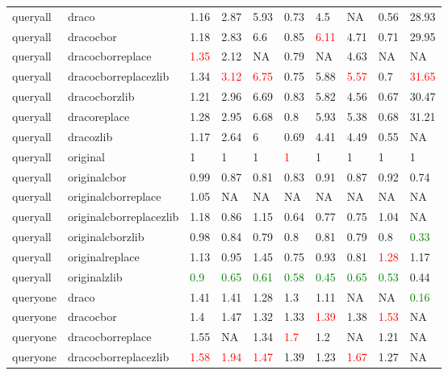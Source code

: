 \begin{landscape}
\begin{longtable}{llllllllll}
\rowcolor{lightgray}  queryall & draco & 1.16 & 2.87 & 5.93 & 0.73 & 4.5 & NA & 0.56 & 28.93\\
\rowcolor{lightgray}  queryall & dracocbor & 1.18 & 2.83 & 6.6 & 0.85 & \textcolor{red}{6.11} & 4.71 & 0.71 & 29.95\\
\rowcolor{lightgray}  queryall & dracocborreplace & \textcolor{red}{1.35} & 2.12 & NA & 0.79 & NA & 4.63 & NA & NA\\
\rowcolor{lightgray}  queryall & dracocborreplacezlib & 1.34 & \textcolor{red}{3.12} & \textcolor{red}{6.75} & 0.75 & 5.88 & \textcolor{red}{5.57} & 0.7 & \textcolor{red}{31.65}\\
\rowcolor{lightgray}  queryall & dracocborzlib & 1.21 & 2.96 & 6.69 & 0.83 & 5.82 & 4.56 & 0.67 & 30.47\\
\rowcolor{lightgray}  queryall & dracoreplace & 1.28 & 2.95 & 6.68 & 0.8 & 5.93 & 5.38 & 0.68 & 31.21\\
\rowcolor{lightgray}  queryall & dracozlib & 1.17 & 2.64 & 6 & 0.69 & 4.41 & 4.49 & 0.55 & NA\\
queryall & original & 1 & 1 & 1 & \textcolor{red}{1} & 1 & 1 & 1 & 1\\
queryall & originalcbor & 0.99 & 0.87 & 0.81 & 0.83 & 0.91 & 0.87 & 0.92 & 0.74\\
queryall & originalcborreplace & 1.05 & NA & NA & NA & NA & NA & NA & NA\\
queryall & originalcborreplacezlib & 1.18 & 0.86 & 1.15 & 0.64 & 0.77 & 0.75 & 1.04 & NA\\
queryall & originalcborzlib & 0.98 & 0.84 & 0.79 & 0.8 & 0.81 & 0.79 & 0.8 & \textcolor{green}{0.33}\\
queryall & originalreplace & 1.13 & 0.95 & 1.45 & 0.75 & 0.93 & 0.81 & \textcolor{red}{1.28} & 1.17\\
queryall & originalzlib & \textcolor{green}{0.9} & \textcolor{green}{0.65} & \textcolor{green}{0.61} & \textcolor{green}{0.58} & \textcolor{green}{0.45} & \textcolor{green}{0.65} & \textcolor{green}{0.53} & 0.44\\
queryone & draco & 1.41 & 1.41 & 1.28 & 1.3 & 1.11 & NA & NA & \textcolor{green}{0.16}\\
queryone & dracocbor & 1.4 & 1.47 & 1.32 & 1.33 & \textcolor{red}{1.39} & 1.38 & \textcolor{red}{1.53} & NA\\
queryone & dracocborreplace & 1.55 & NA & 1.34 & \textcolor{red}{1.7} & 1.2 & NA & 1.21 & NA\\
queryone & dracocborreplacezlib & \textcolor{red}{1.58} & \textcolor{red}{1.94} & \textcolor{red}{1.47} & 1.39 & 1.23 & \textcolor{red}{1.67} & 1.27 & NA\\

\end{longtable}
\end{landscape}
